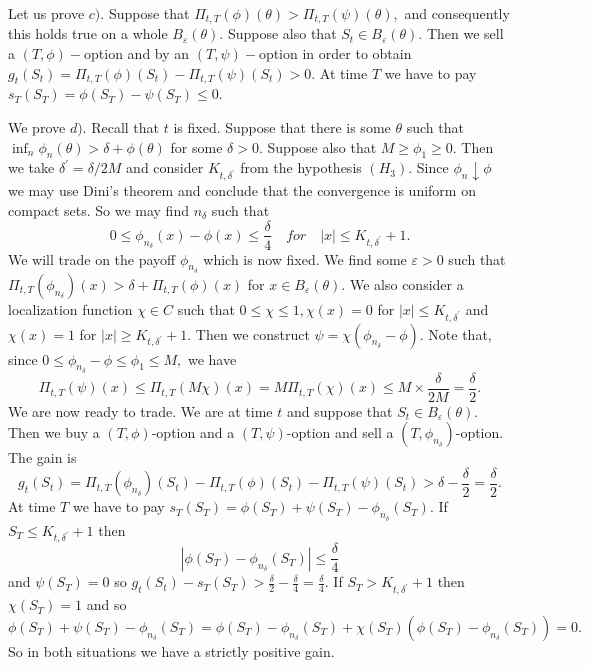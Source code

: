 \documentclass[a4paper]{article}
\begin{document}
Let us prove $c).$ Suppose that $\Pi _{t,T}(\phi )(\theta )>\Pi _{t,T}(\psi
)(\theta ),$ and consequently this holds true on a whole $B_{\varepsilon
}(\theta ).$ Suppose also that $S_{t}\in B_{\varepsilon }(\theta ).$ Then we
sell a $(T,\phi )-$option and by an $(T,\psi )-$option in order to obtain $%
g_{t}(S_{t})=\Pi _{t,T}(\phi )(S_{t})-\Pi _{t,T}(\psi )(S_{t})>0.$ At time $%
T $ we have to pay $s_{T}(S_{T})=\phi (S_{T})-\psi (S_{T})\leq 0.$

We prove $d).$ Recall that $t$ is fixed. Suppose that there is some $\theta $
such that $\inf_{n}\phi _{n}(\theta )>\delta +\phi (\theta )$ for some $%
\delta >0.$ Suppose also that $M\geq \phi _{1}\geq 0.$ Then we take $\delta
^{\prime }=\delta /2M$ and consider $K_{t,\delta ^{\prime }}$ from the
hypothesis $(H_{3}).$ Since $\phi _{n}\downarrow \phi $ we may use Dini's
theorem and conclude that the convergence is uniform on compact sets. So we
may find $n_{\delta }$ such that
\[
0\leq \phi _{n_{\delta }}(x)-\phi (x)\leq \frac{\delta }{4}\quad for\quad
\left| x\right| \leq K_{t,\delta ^{\prime }}+1.
\]
We will trade on the payoff $\phi _{n_{\delta }}$ which is now fixed. We
find some $\varepsilon >0$ such that $\Pi _{t,T}(\phi _{n_{\delta
}})(x)>\delta +\Pi _{t,T}(\phi )(x)$ for $x\in B_{\varepsilon }(\theta ).$
We also consider a localization function $\chi \in C$ such that $0\leq \chi
\leq 1,\chi (x)=0$ for $\left| x\right| \leq K_{t,\delta ^{\prime }}$ and $%
\chi (x)=1$ for $\left| x\right| \geq K_{t,\delta ^{\prime }}+1.$ Then we
construct $\psi =\chi (\phi _{n_{\delta }}-\phi ).$ Note that, since $0\leq
\phi _{n_{\delta }}-\phi \leq \phi _{1}\leq M,$ we have
\[
\Pi _{t,T}(\psi )(x)\leq \Pi _{t,T}(M\chi )(x)=M\Pi _{t,T}(\chi )(x)\leq
M\times \frac{\delta }{2M}=\frac{\delta }{2}.
\]
We are now ready to trade. We are at time $t$ and suppose that $S_{t}\in
B_{\varepsilon }(\theta ).$ Then we buy a $(T,\phi )$-option and a $(T,\psi
) $-option and sell a $(T,\phi _{n_{\delta }})$-option. The gain is
\[
g_{t}(S_{t})=\Pi _{t,T}(\phi _{n_{\delta }})(S_{t})-\Pi _{t,T}(\phi
)(S_{t})-\Pi _{t,T}(\psi )(S_{t})>\delta -\frac{\delta }{2}=\frac{\delta }{2}%
.
\]
At time $T$ we have to pay $s_{T}(S_{T})=\phi (S_{T})+\psi
(S_{T})-\phi _{n_{\delta }}(S_{T}).$ If $S_{T}\leq K_{t,\delta
^{\prime }}+1$ then $$ \left| \phi (S_{T})-\phi _{n_{\delta
}}(S_{T})\right| \leq \frac{\delta }{4}$$ and $\psi (S_{T})=0$ so
$g_{t}(S_{t})-s_{T}(S_{T})>\frac{\delta }{2}-\frac{ \delta
}{4}=\frac{\delta }{4}.$ If $S_{T}>K_{t,\delta ^{\prime }}+1$ then
$ \chi (S_{T})=1$ and so $\phi (S_{T})+\psi (S_{T})-\phi
_{n_{\delta }}(S_{T})=\phi (S_{T})-\phi _{n_{\delta }}(S_{T})+\chi
(S_{T})(\phi (S_{T})-\phi _{n_{\delta }}(S_{T}))=0.$ So in both
situations we have a strictly positive gain.
\end{document}

